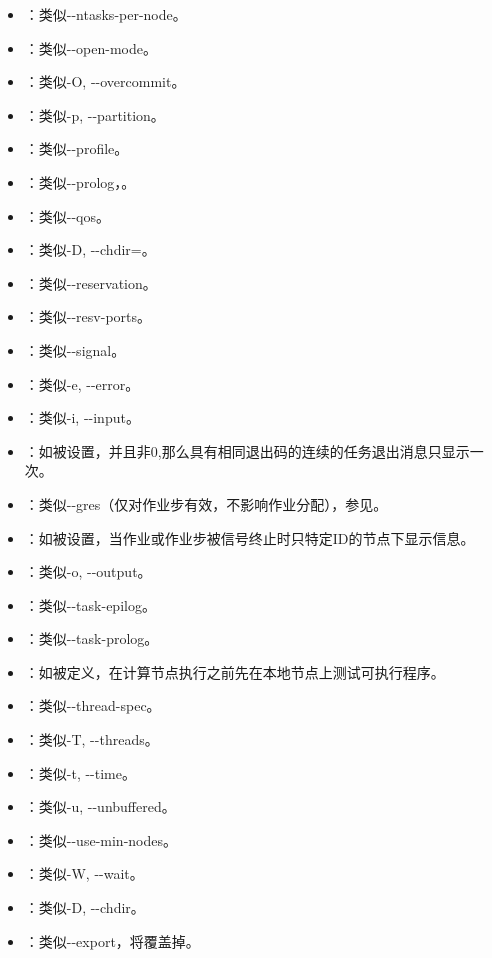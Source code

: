 \begin{itemize}
	\item {}：类似-{}-ntasks-per-node。
	\item {}：类似-{}-open-mode。
	\item {}：类似-O, -{}-overcommit。
	\item {}：类似-p, -{}-partition。
	\item {}：类似-{}-profile。
	\item {}：类似-{}-prolog，。
	\item {}：类似-{}-qos。
	\item {}：类似-D, -{}-chdir=。
	\item {}：类似-{}-reservation。
	\item {}：类似-{}-resv-ports。
	\item {}：类似-{}-signal。
	\item {}：类似-e, -{}-error。
	\item {}：类似-i, -{}-input。
	\item {}：如被设置，并且非0,那么具有相同退出码的连续的任务退出消息只显示一次。
	\item {}：类似-{}-gres（仅对作业步有效，不影响作业分配），参见。
	\item {}：如被设置，当作业或作业步被信号终止时只特定ID的节点下显示信息。
	\item {}：类似-o, -{}-output。
	\item {}：类似-{}-task-epilog。
	\item {}：类似-{}-task-prolog。
	\item {}：如被定义，在计算节点执行之前先在本地节点上测试可执行程序。
	\item {}：类似-{}-thread-spec。
	\item {}：类似-T, -{}-threads。
	\item {}：类似-t, -{}-time。
	\item {}：类似-u, -{}-unbuffered。
	\item {}：类似-{}-use-min-nodes。
	\item {}：类似-W, -{}-wait。
	\item {}：类似-D, -{}-chdir。
	\item {}：类似-{}-export，将覆盖掉。
\end{itemize}

